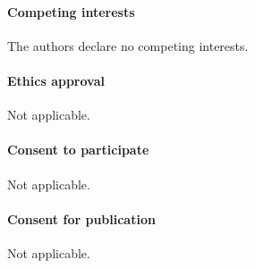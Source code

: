 \vspace{-1em}
\paragraph{\large Competing interests}
The authors declare no competing interests.

\vspace{-1em}
\paragraph{\large Ethics approval}
Not applicable.

\vspace{-1em}
\paragraph{\large Consent to participate}
Not applicable.

\vspace{-1em}
\paragraph{\large Consent for publication}
Not applicable.
